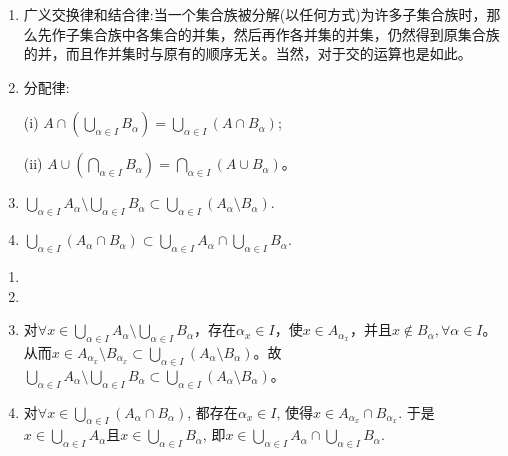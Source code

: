 \documentclass[../../main.tex]{subfiles}
\begin{document}
\begin{theorem}\label{theorem:集族的并和交的基本性质}
\begin{enumerate}[(1)]
\item 广义交换律和结合律:当一个集合族被分解(以任何方式)为许多子集合族时，那么先作子集合族中各集合的并集，然后再作各并集的并集，仍然得到原集合族的并，而且作并集时与原有的顺序无关。当然，对于交的运算也是如此。

\item 分配律:

(i) \(A\cap\left(\bigcup_{\alpha\in I}B_{\alpha}\right)=\bigcup_{\alpha\in I}(A\cap B_{\alpha})\);

(ii) \(A\cup\left(\bigcap_{\alpha\in I}B_{\alpha}\right)=\bigcap_{\alpha\in I}(A\cup B_{\alpha})\)。

\item \(\bigcup_{\alpha \in I} A_{\alpha} \setminus \bigcup_{\alpha \in I} B_{\alpha} \subset \bigcup_{\alpha \in I} (A_{\alpha} \setminus B_{\alpha}).\)

\item $\bigcup_{\alpha \in I}{\left( A_{\alpha}\cap B_{\alpha} \right)}\subset \bigcup_{\alpha \in I}{A_{\alpha}}\cap \bigcup_{\alpha \in I}{B_{\alpha}}.$
\end{enumerate}
\end{theorem}
\begin{enumerate}[(1)]
\item 

\item 

\item 对\(\forall x \in \bigcup_{\alpha \in I} A_{\alpha} \setminus \bigcup_{\alpha \in I} B_{\alpha}\)，存在\(\alpha_x \in I\)，使\(x \in A_{\alpha_x}\)，并且\(x \notin B_{\alpha}, \forall \alpha \in I\)。从而\(x \in A_{\alpha_x} \setminus B_{\alpha_x} \subset \bigcup_{\alpha \in I} (A_{\alpha} \setminus B_{\alpha})\)。故\(\bigcup_{\alpha \in I} A_{\alpha} \setminus \bigcup_{\alpha \in I} B_{\alpha} \subset \bigcup_{\alpha \in I} (A_{\alpha} \setminus B_{\alpha})\)。

\item 对$\forall x\in \bigcup_{\alpha \in I}{\left( A_{\alpha}\cap B_{\alpha} \right)}$, 都存在$\alpha _x\in I$, 使得$x\in A_{\alpha _x}\cap B_{\alpha _x}$. 于是$x\in \bigcup_{\alpha \in I}{A_{\alpha}}$且$x\in \bigcup_{\alpha \in I}{B_{\alpha}}$, 即$x\in \bigcup_{\alpha \in I}{A_{\alpha}}\cap \bigcup_{\alpha \in I}{B_{\alpha}}$. 
\end{enumerate}
\end{document}

